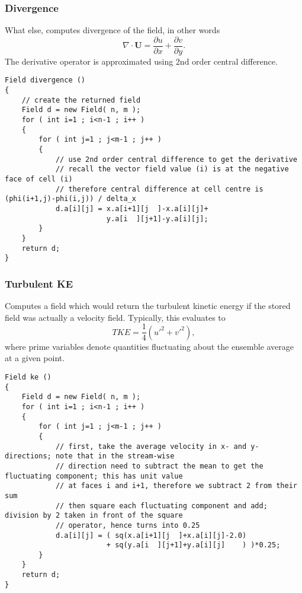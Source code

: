 \documentclass[notitlepage]{article}
\begin{document}
\subsubsection{Divergence}

What else, computes divergence of the field, in other words
%
\begin{equation}
\nabla \cdot \mathbf{U} = \frac{\partial u}{\partial x} + \frac{\partial v}{\partial y} .
\end{equation}
%
The derivative operator is approximated using 2nd order central difference.

\begin{lstlisting}[style=myCpp]
Field divergence ()
{
	// create the returned field
	Field d = new Field( n, m );
	for ( int i=1 ; i<n-1 ; i++ )
	{
		for ( int j=1 ; j<m-1 ; j++ )
		{
			// use 2nd order central difference to get the derivative
			// recall the vector field value (i) is at the negative face of cell (i)
			// therefore central difference at cell centre is (phi(i+1,j)-phi(i,j)) / delta_x
			d.a[i][j] = x.a[i+1][j  ]-x.a[i][j]+
						y.a[i  ][j+1]-y.a[i][j];
		}
	}
	return d;
}
\end{lstlisting}

\subsubsection{Turbulent KE}

Computes a field which would return the turbulent kinetic energy if the stored
field was actually a velocity field. Typically, this evaluates to
%
\begin{equation}
TKE = \frac{1}{4} \left( u'^2 + v'^2 \right),
\end{equation}
%
where prime variables denote quantities fluctuating about the ensemble average at a given point.

\begin{lstlisting}[style=myCpp]
Field ke ()
{
	Field d = new Field( n, m );
	for ( int i=1 ; i<n-1 ; i++ )
	{
		for ( int j=1 ; j<m-1 ; j++ )
		{
			// first, take the average velocity in x- and y-directions; note that in the stream-wise
			// direction need to subtract the mean to get the fluctuating component; this has unit value
			// at faces i and i+1, therefore we subtract 2 from their sum
			// then square each fluctuating component and add; division by 2 taken in front of the square
			// operator, hence turns into 0.25
			d.a[i][j] = ( sq(x.a[i+1][j  ]+x.a[i][j]-2.0)
				 		+ sq(y.a[i  ][j+1]+y.a[i][j]    ) )*0.25;
		}
	}
	return d;
}
\end{lstlisting}
\end{document}
